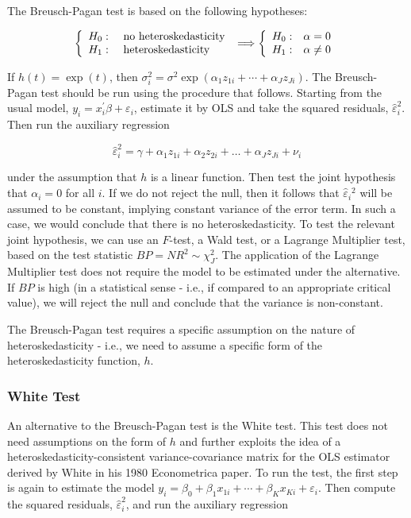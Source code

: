 The Breusch-Pagan test is based on the following hypotheses:

$$
\left\{\begin{array} { l l } 
{ H _ { 0 } : } & { \text { no heteroskedasticity } } \\
{ H _ { 1 } : } & { \text { heteroskedasticity } }
\end{array} \Longrightarrow \left\{\begin{array}{ll}
H_{0}: & \alpha=0 \\
H_{1}: & \alpha \neq 0
\end{array}\right.\right.
$$

If $h(t)=\exp (t)$, then $\sigma_{i}^{2}=\sigma^{2} \exp \left(\alpha_{1} z_{1 i}+\cdots+\alpha_{J} z_{J i}\right)$. The Breusch-Pagan test should be run using the procedure that follows. Starting from the usual model, $y_{i}=x_{i}^{\prime} \beta+\varepsilon_{i}$, estimate it by OLS and take the squared residuals, $\widehat{\varepsilon}_{i}^{2}$. Then run the auxiliary regression

$$
\widehat{\varepsilon}_{i}^{2}=\gamma+\alpha_{1} z_{1 i}+\alpha_{2} z_{2 i}+\ldots+\alpha_{J} z_{J i}+\nu_{i}
$$

under the assumption that $h$ is a linear function. Then test the joint hypothesis that $\alpha_{i}=0$ for all $i$. If we do not reject the null, then it follows that $\widehat{\varepsilon}_{i}{ }^{2}$ will be assumed to be constant, implying constant variance of the error term. In such a case, we would conclude that there is no heteroskedasticity. To test the relevant joint hypothesis, we can use an $F$-test, a Wald test, or a Lagrange Multiplier test, based on the test statistic $B P=N R^{2} \sim \chi_{J}^{2}$. The application of the Lagrange Multiplier test does not require the model to be estimated under the alternative. If $B P$ is high (in a statistical sense - i.e., if compared to an appropriate critical value), we will reject the null and conclude that the variance is non-constant.

The Breusch-Pagan test requires a specific assumption on the nature of heteroskedasticity - i.e., we need to assume a specific form of the heteroskedasticity function, $h$.

\subsubsection{White Test}
An alternative to the Breusch-Pagan test is the White test. This test does not need assumptions on the form of $h$ and further exploits the idea of a heteroskedasticity-consistent variance-covariance matrix for the OLS estimator derived by White in his 1980 Econometrica paper. To run the test, the first step is again to estimate the model $y_{i}=\beta_{0}+\beta_{1} x_{1 i}+\cdots+\beta_{K} x_{K i}+\varepsilon_{i}$. Then compute the squared residuals, $\widehat{\varepsilon}_{i}^{2}$, and run the auxiliary regression

